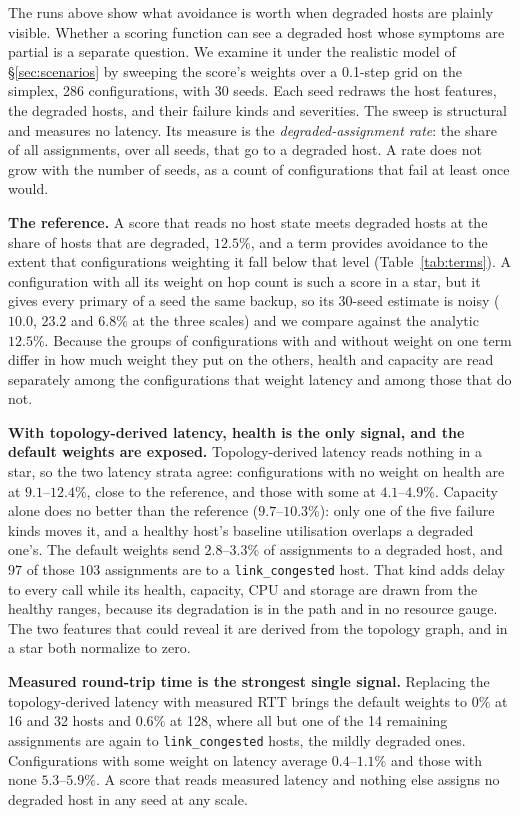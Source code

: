 The runs above show what avoidance is worth when degraded hosts are plainly
visible. Whether a scoring function can see a degraded host whose symptoms are
partial is a separate question. We examine it under the realistic model of
\S\ref{sec:scenarios} by sweeping the score's weights over a 0.1-step grid on
the simplex, 286 configurations, with 30 seeds. Each seed redraws the host
features, the degraded hosts, and their failure kinds and severities. The
sweep is structural and measures no latency. Its measure is the
\emph{degraded-assignment rate}: the share of all assignments, over all seeds,
that go to a degraded host. A rate does not grow with the number of seeds, as a
count of configurations that fail at least once would.

\textbf{The reference.} A score that reads no host state meets degraded hosts
at the share of hosts that are degraded, $12.5\%$, and a term provides
avoidance to the extent that configurations weighting it fall below that
level (Table~\ref{tab:terms}). A configuration with all its weight on hop
count is such a score in a star, but it gives every primary of a seed the same
backup, so its 30-seed estimate is noisy ($10.0$, $23.2$ and $6.8\%$ at the
three scales) and we compare against the analytic $12.5\%$. Because the groups
of configurations with and without weight on one term differ in how much
weight they put on the others, health and capacity are read separately among
the configurations that weight latency and among those that do not.

\textbf{With topology-derived latency, health is the only signal, and the
default weights are exposed.} Topology-derived latency reads nothing in a
star, so the two latency strata agree: configurations with no weight on health
are at $9.1$--$12.4\%$, close to the reference, and those with some at
$4.1$--$4.9\%$. Capacity alone does no better than the reference
($9.7$--$10.3\%$): only one of
the five failure kinds moves it, and a healthy host's baseline utilisation
overlaps a degraded one's. The default weights send $2.8$--$3.3\%$ of
assignments to a degraded host, and $97$ of those $103$ assignments are to a
\texttt{link\_congested} host. That kind adds delay to every call while its
health, capacity, CPU and storage are drawn from the healthy ranges, because
its degradation is in the path and in no resource gauge. The two features that
could reveal it are derived from the topology graph, and in a star both
normalize to zero.

\textbf{Measured round-trip time is the strongest single signal.} Replacing
the topology-derived latency with measured RTT brings the default weights to
$0\%$ at 16 and 32 hosts and $0.6\%$ at 128, where all but one of the 14
remaining assignments are again to \texttt{link\_congested} hosts, the mildly
degraded ones. Configurations with some weight on latency average
$0.4$--$1.1\%$ and those with none $5.3$--$5.9\%$. A score that reads measured
latency and nothing else assigns no degraded host in any seed at any scale.

